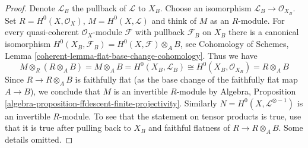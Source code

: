 \documentclass[10pt,a4paper]{amsart}
\theoremstyle{plain}
\theoremstyle{definition}
\theoremstyle{remark}
\numberwithin{equation}{subsection}
\begin{document}
\begin{proof}
Denote $\mathcal{L}_B$ the pullback of $\mathcal{L}$ to $X_B$.
Choose an isomorphism $\mathcal{L}_B \to \mathcal{O}_{X_B}$.
Set $R = H^0(X, \mathcal{O}_X)$, $M = H^0(X, \mathcal{L})$ and think of
$M$ as an $R$-module. For every quasi-coherent $\mathcal{O}_X$-module
$\mathcal{F}$ with pullback $\mathcal{F}_B$ on $X_B$ there is a
canonical isomorphism
$H^0(X_B, \mathcal{F}_B) = H^0(X, \mathcal{F}) \otimes_A B$, see
Cohomology of Schemes, Lemma \ref{coherent-lemma-flat-base-change-cohomology}.
Thus we have
$$
M \otimes_R (R \otimes_A B) =
M \otimes_A B = H^0(X_B, \mathcal{L}_B) \cong
H^0(X_B, \mathcal{O}_{X_B}) = R \otimes_A B
$$
Since $R \to R \otimes_A B$ is faithfully flat (as the base change
of the faithfully flat map $A \to B$), we conclude
that $M$ is an invertible $R$-module by
Algebra, Proposition \ref{algebra-proposition-ffdescent-finite-projectivity}.
Similarly $N = H^0(X, \mathcal{L}^{\otimes -1})$ is an invertible $R$-module.
To see that the statement on tensor products is true, use that it is true
after pulling back to $X_B$ and faithful flatness of $R \to R \otimes_A B$.
Some details omitted.
\end{proof}
\end{document}
